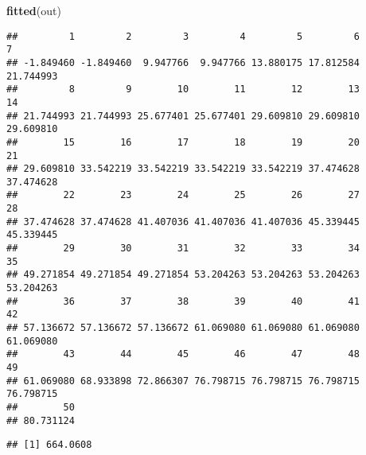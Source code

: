 \documentclass[]{article}
\newenvironment{Shaded}{\begin{snugshade}}{\end{snugshade}}
\newcommand{\KeywordTok}[1]{\textcolor[rgb]{0.13,0.29,0.53}{\textbf{#1}}}
\newcommand{\CommentTok}[1]{\textcolor[rgb]{0.56,0.35,0.01}{\textit{#1}}}
\newcommand{\OperatorTok}[1]{\textcolor[rgb]{0.81,0.36,0.00}{\textbf{#1}}}
\newcommand{\NormalTok}[1]{#1}
\begin{document}
\begin{Shaded}
\begin{Highlighting}[]
\KeywordTok{fitted}\NormalTok{(out) }
\end{Highlighting}
\end{Shaded}

\begin{verbatim}
##         1         2         3         4         5         6         7 
## -1.849460 -1.849460  9.947766  9.947766 13.880175 17.812584 21.744993 
##         8         9        10        11        12        13        14 
## 21.744993 21.744993 25.677401 25.677401 29.609810 29.609810 29.609810 
##        15        16        17        18        19        20        21 
## 29.609810 33.542219 33.542219 33.542219 33.542219 37.474628 37.474628 
##        22        23        24        25        26        27        28 
## 37.474628 37.474628 41.407036 41.407036 41.407036 45.339445 45.339445 
##        29        30        31        32        33        34        35 
## 49.271854 49.271854 49.271854 53.204263 53.204263 53.204263 53.204263 
##        36        37        38        39        40        41        42 
## 57.136672 57.136672 57.136672 61.069080 61.069080 61.069080 61.069080 
##        43        44        45        46        47        48        49 
## 61.069080 68.933898 72.866307 76.798715 76.798715 76.798715 76.798715 
##        50 
## 80.731124
\end{verbatim}

\begin{Shaded}
\end{Shaded}

\begin{verbatim}
## [1] 664.0608
\end{verbatim}
\end{document}
